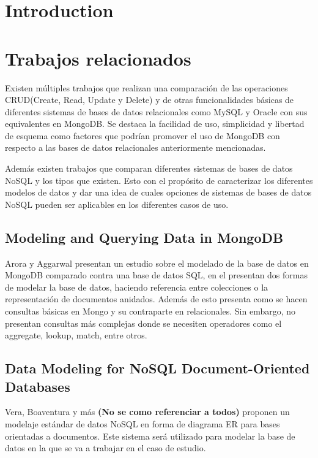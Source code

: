 \documentclass[conference,compsoc]{sty/IEEEtran}
\begin{document}
\section{Introduction}


\section{Trabajos relacionados}
Existen múltiples trabajos que realizan una comparación de las operaciones CRUD(Create, Read, Update y Delete) y de otras funcionalidades básicas de diferentes sistemas de bases de datos relacionales como MySQL\cite{CRUDMongoMySQL} y Oracle\cite{MongoDBvsOracle} con sus equivalentes en MongoDB. Se destaca la facilidad de uso, simplicidad y libertad de esquema como factores que podrían promover el uso de MongoDB con respecto a las bases de datos relacionales anteriormente mencionadas. 

Además existen trabajos que comparan diferentes sistemas de bases de datos NoSQL y los tipos que existen\cite{MongovsCassandravsCouch}\cite{NoSQLDatabases}\cite{TypesNoSQLDBs}. Esto con el propósito de caracterizar los diferentes modelos de datos y dar una idea de cuales opciones de sistemas de bases de datos NoSQL pueden ser aplicables en los diferentes casos de uso.

\subsection{Modeling and Querying Data in MongoDB}
Arora y Aggarwal \cite{AroraAggarwal} presentan un estudio sobre el modelado de la base de datos en MongoDB comparado contra una base de datos SQL, en el presentan dos formas de modelar la base de datos, haciendo referencia entre colecciones o la representación de documentos anidados. Además de esto presenta como se hacen consultas básicas en Mongo y su contraparte en relacionales. Sin embargo, no presentan consultas más complejas donde se necesiten operadores como el aggregate, lookup, match, entre otros.

\subsection{Data Modeling for NoSQL Document-Oriented Databases}

Vera, Boaventura y más \textbf{(No se como referenciar a todos)} \cite{VeraBoa} proponen un modelaje estándar de datos NoSQL en forma de diagrama ER para bases orientadas a documentos. Este sistema será utilizado para modelar la base de datos en la que se va a trabajar en el caso de estudio.
\end{document}
